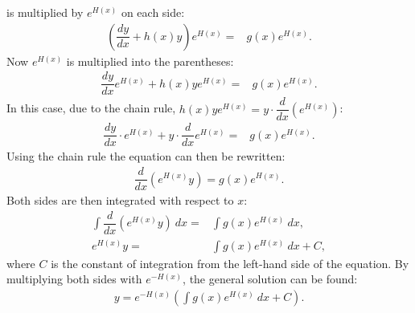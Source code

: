 \begin{prof}{}{}
 is multiplied by $e^{H(x)}$ on each side:
\begin{align*}
\left(\dfrac{dy}{dx}+h(x)y\right)e^{H(x)}=& g(x)e^{H(x)}.
\end{align*}
Now $e^{H(x)}$ is multiplied into the parentheses:
\begin{align*}
\dfrac{dy}{dx}e^{H(x)}+h(x)ye^{H(x)}=& g(x)e^{H(x)}.
\end{align*}
In this case, due to the chain rule, $h(x)ye^{H(x)} = y \cdot \dfrac{d}{dx} \left(e^{H(x)} \right)$:
\begin{align*}
\dfrac{dy}{dx} \cdot e^{H(x)} + y \cdot \dfrac{d}{dx}e^{H(x)}=& g(x)e^{H(x)}.
\end{align*}
Using the chain rule the equation can then be rewritten:
\begin{align*}
\dfrac{d}{dx}\left(e^{H(x)}y\right)=g(x)e^{H(x)}.
\end{align*}
Both sides are then integrated with respect to $x$:
\begin{align*}
\int\dfrac{d}{dx}\left(e^{H(x)}y\right)\ dx=&\int g(x)e^{H(x)}\ dx,
\\
e^{H(x)}y=&\int g(x)e^{H(x)}\ dx+C,
\end{align*}
where $C$ is the constant of integration from the left-hand side of the  equation. By multiplying both sides with $e^{-H(x)}$, the general solution can be found:
\begin{align*}
y=e^{-H(x)}\left(\int g(x)e^{H(x)}\ dx+C\right).
\end{align*}
\end{prof}

